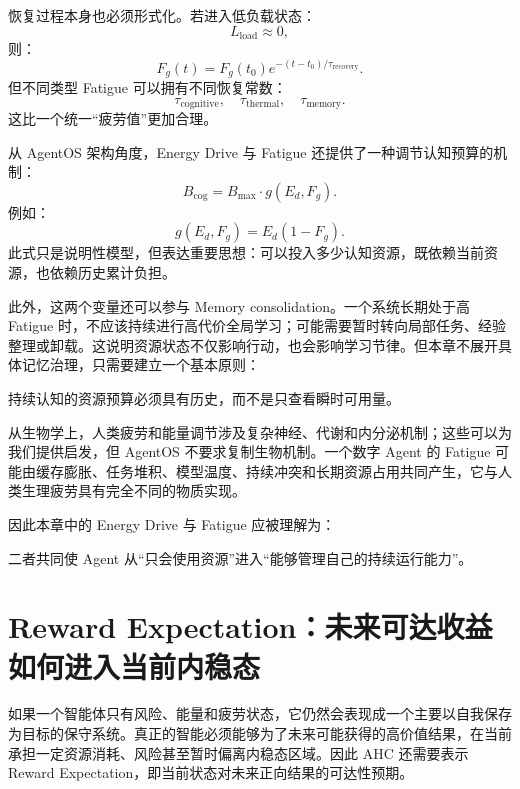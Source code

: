 恢复过程本身也必须形式化。若进入低负载状态：
\[
L_{\mathrm{load}}\approx0,
\]
则：
\[
F_g(t)
=
F_g(t_0)e^{-(t-t_0)/\tau_{\mathrm{recovery}}}.
\]
但不同类型 Fatigue 可以拥有不同恢复常数：
\[
\tau_{\mathrm{cognitive}},
\quad
\tau_{\mathrm{thermal}},
\quad
\tau_{\mathrm{memory}}.
\]
这比一个统一“疲劳值”更加合理。

从 AgentOS 架构角度，Energy Drive 与 Fatigue 还提供了一种调节认知预算的机制：
\[
B_{\mathrm{cog}}
=
B_{\max}
\cdot
g(E_d,F_g).
\]
例如：
\[
g(E_d,F_g)
=
E_d(1-F_g).
\]
此式只是说明性模型，但表达重要思想：可以投入多少认知资源，既依赖当前资源，也依赖历史累计负担。

此外，这两个变量还可以参与 Memory consolidation。一个系统长期处于高 Fatigue 时，不应该持续进行高代价全局学习；可能需要暂时转向局部任务、经验整理或卸载。这说明资源状态不仅影响行动，也会影响学习节律。但本章不展开具体记忆治理，只需要建立一个基本原则：
\begin{proposition*}
持续认知的资源预算必须具有历史，而不是只查看瞬时可用量。
\end{proposition*}

从生物学上，人类疲劳和能量调节涉及复杂神经、代谢和内分泌机制；这些可以为我们提供启发，但 AgentOS 不要求复制生物机制。一个数字 Agent 的 Fatigue 可能由缓存膨胀、任务堆积、模型温度、持续冲突和长期资源占用共同产生，它与人类生理疲劳具有完全不同的物质实现。

因此本章中的 Energy Drive 与 Fatigue 应被理解为：
\begin{statementbox}
\centering
{}
\end{statementbox}
\begin{statementbox}
\centering
{}
\end{statementbox}
二者共同使 Agent 从“只会使用资源”进入“能够管理自己的持续运行能力”。

\section{Reward Expectation：未来可达收益如何进入当前内稳态}

如果一个智能体只有风险、能量和疲劳状态，它仍然会表现成一个主要以自我保存为目标的保守系统。真正的智能必须能够为了未来可能获得的高价值结果，在当前承担一定资源消耗、风险甚至暂时偏离内稳态区域。因此 AHC 还需要表示 Reward Expectation，即当前状态对未来正向结果的可达性预期。

